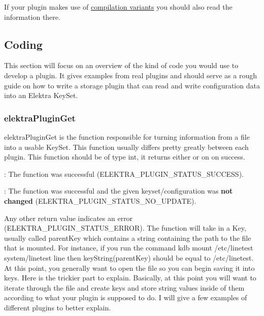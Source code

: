 If your plugin makes use of \hyperlink{doc_tutorials_compilation-variants_md}{compilation variants} you should also read the information there.

\subsection*{Coding}

This section will focus on an overview of the kind of code you would use to develop a plugin. It gives examples from real plugins and should serve as a rough guide on how to write a storage plugin that can read and write configuration data into an Elektra {\ttfamily Key\+Set}.

\subsubsection*{{\ttfamily elektra\+Plugin\+Get}}

{\ttfamily elektra\+Plugin\+Get} is the function responsible for turning information from a file into a usable {\ttfamily Key\+Set}. This function usually differs pretty greatly between each plugin. This function should be of type {\ttfamily int}, it returns either {} or on {} on success.


\begin{DoxyItemize}
\item {}\+: The function was successful ({\ttfamily E\+L\+E\+K\+T\+R\+A\+\_\+\+P\+L\+U\+G\+I\+N\+\_\+\+S\+T\+A\+T\+U\+S\+\_\+\+S\+U\+C\+C\+E\+SS}).
\item {}\+: The function was successful and the given keyset/configuration was {\bfseries not changed} ({\ttfamily E\+L\+E\+K\+T\+R\+A\+\_\+\+P\+L\+U\+G\+I\+N\+\_\+\+S\+T\+A\+T\+U\+S\+\_\+\+N\+O\+\_\+\+U\+P\+D\+A\+TE}).
\end{DoxyItemize}

Any other return value indicates an error ({\ttfamily E\+L\+E\+K\+T\+R\+A\+\_\+\+P\+L\+U\+G\+I\+N\+\_\+\+S\+T\+A\+T\+U\+S\+\_\+\+E\+R\+R\+OR}). The function will take in a {\ttfamily Key}, usually called {\ttfamily parent\+Key} which contains a string containing the path to the file that is mounted. For instance, if you run the command {\ttfamily kdb mount /etc/linetest system/linetest line} then {\ttfamily key\+String(parent\+Key)} should be equal to {\ttfamily /etc/linetest}. At this point, you generally want to open the file so you can begin saving it into keys. Here is the trickier part to explain. Basically, at this point you will want to iterate through the file and create keys and store string values inside of them according to what your plugin is supposed to do. I will give a few examples of different plugins to better explain.

